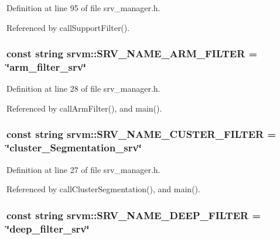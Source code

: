 Definition at line 95 of file srv\-\_\-manager.\-h.



Referenced by call\-Support\-Filter().

\hypertarget{namespacesrvm_ac0600b046091267fd4d0aed25786961f}{
\subsubsection[{S\-R\-V\-\_\-\-N\-A\-M\-E\-\_\-\-A\-R\-M\-\_\-\-F\-I\-L\-T\-E\-R}]{\setlength{\rightskip}{0pt plus 5cm}const string srvm\-::\-S\-R\-V\-\_\-\-N\-A\-M\-E\-\_\-\-A\-R\-M\-\_\-\-F\-I\-L\-T\-E\-R = \char`\"{}arm\-\_\-filter\-\_\-srv\char`\"{}}}\label{namespacesrvm_ac0600b046091267fd4d0aed25786961f}


Definition at line 28 of file srv\-\_\-manager.\-h.



Referenced by call\-Arm\-Filter(), and main().

\hypertarget{namespacesrvm_af1af7e755b5eb874d7bc4fec3d6585b2}{
\subsubsection[{S\-R\-V\-\_\-\-N\-A\-M\-E\-\_\-\-C\-U\-S\-T\-E\-R\-\_\-\-F\-I\-L\-T\-E\-R}]{\setlength{\rightskip}{0pt plus 5cm}const string srvm\-::\-S\-R\-V\-\_\-\-N\-A\-M\-E\-\_\-\-C\-U\-S\-T\-E\-R\-\_\-\-F\-I\-L\-T\-E\-R = \char`\"{}cluster\-\_\-\-Segmentation\-\_\-srv\char`\"{}}}\label{namespacesrvm_af1af7e755b5eb874d7bc4fec3d6585b2}


Definition at line 27 of file srv\-\_\-manager.\-h.



Referenced by call\-Cluster\-Segmentation(), and main().

\hypertarget{namespacesrvm_aef26ae8da6e703be7bbc1fc319fc18d5}{
\subsubsection[{S\-R\-V\-\_\-\-N\-A\-M\-E\-\_\-\-D\-E\-E\-P\-\_\-\-F\-I\-L\-T\-E\-R}]{\setlength{\rightskip}{0pt plus 5cm}const string srvm\-::\-S\-R\-V\-\_\-\-N\-A\-M\-E\-\_\-\-D\-E\-E\-P\-\_\-\-F\-I\-L\-T\-E\-R = \char`\"{}deep\-\_\-filter\-\_\-srv\char`\"{}}}\label{namespacesrvm_aef26ae8da6e703be7bbc1fc319fc18d5}


